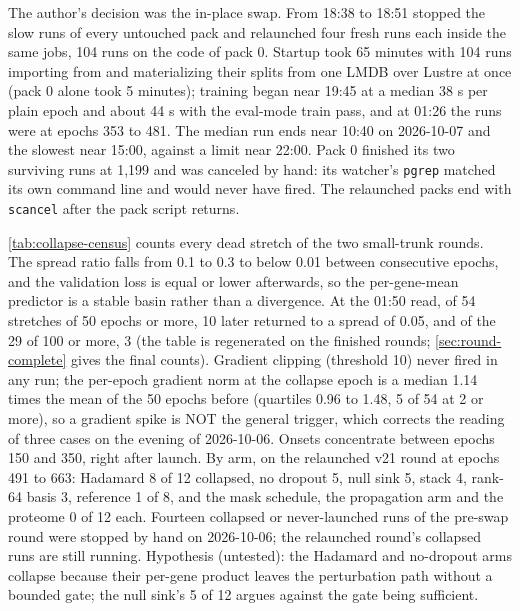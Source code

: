  The author's decision was the
in-place swap. From 18:38 to 18:51  stopped the slow runs of
every untouched pack and relaunched four fresh runs each inside the same jobs, 104 runs on
the code of pack 0. Startup took 65 minutes with 104 runs importing from  and
materializing their splits from one LMDB over Lustre at once (pack 0 alone took 5 minutes);
training began near 19:45 at a median 38 s per plain epoch and about 44 s with the eval-mode
train pass, and at 01:26 the runs were at epochs 353 to 481. The median run ends near 10:40
on 2026-10-07 and the slowest near 15:00, against a limit near 22:00. Pack 0 finished its two
surviving runs at 1{,}199 and was canceled by hand: its watcher's \texttt{pgrep} matched its
own command line and would never have fired. The relaunched packs end with
\texttt{scancel} after the pack script returns.

\cref{tab:collapse-census} counts every dead stretch of the two small-trunk rounds. The
spread ratio falls from 0.1 to 0.3 to below 0.01 between consecutive epochs, and the
validation loss is equal or lower afterwards, so the per-gene-mean predictor is a stable
basin rather than a divergence. At the 01:50 read, of 54 stretches of 50 epochs or more, 10
later returned to a spread of 0.05, and of the 29 of 100 or more, 3 (the table is regenerated
on the finished rounds; \cref{sec:round-complete} gives the final counts). Gradient clipping
(threshold 10) never fired in any run; the per-epoch gradient norm at the collapse epoch is a
median 1.14 times the mean of the 50 epochs before (quartiles 0.96 to 1.48, 5 of 54 at 2 or more), so a
gradient spike is NOT the general trigger, which corrects the reading of three cases on the
evening of 2026-10-06. Onsets concentrate between epochs 150 and 350, right after launch. By
arm, on the relaunched v21 round at epochs 491 to 663: Hadamard 8 of 12 collapsed, no
dropout 5, null sink 5, stack 4, rank-64 basis 3, reference 1 of 8, and the mask schedule,
the propagation arm and the proteome 0 of 12 each. Fourteen collapsed or never-launched runs
of the pre-swap round were stopped by hand on 2026-10-06; the relaunched round's collapsed
runs are still running. Hypothesis (untested): the Hadamard and no-dropout arms collapse
because their per-gene product leaves the perturbation path without a bounded gate; the null
sink's 5 of 12 argues against the gate being sufficient.

